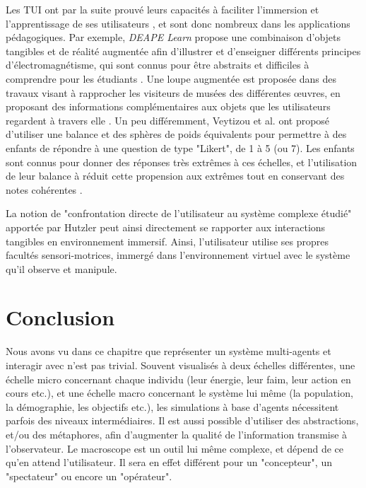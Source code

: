 			Les TUI ont par la suite prouvé leurs capacités à faciliter l'immersion et l'apprentissage de ses utilisateurs \cite{zuckerman_tui_2013, fleck_marker-based_2015, cheng_affordances_2013}, et sont donc nombreux dans les applications pédagogiques. Par exemple, \textit{DEAPE Learn} propose une combinaison d'objets tangibles et de réalité augmentée afin d'illustrer et d'enseigner différents principes d'électromagnétisme, qui sont connus pour être abstraits et difficiles à comprendre pour les étudiants \cite{da_costa_realite_2019}. Une loupe augmentée est proposée dans des travaux visant à rapprocher les visiteurs de musées des différentes œuvres, en proposant des informations complémentaires aux objets que les utilisateurs regardent à travers elle  \cite{damala_loupe_2016}. Un peu différemment, Veytizou et al. ont proposé d'utiliser une balance et des sphères de poids équivalents pour permettre à des enfants de répondre à une question de type "Likert", de 1 à 5 (ou 7). Les enfants sont connus pour donner des réponses très extrêmes à ces échelles, et l'utilisation de leur balance à réduit cette propension aux extrêmes tout en conservant des notes cohérentes \cite{veytizou_could_2018}.
	
	La notion de "confrontation directe de l'utilisateur au système complexe étudié" apportée par Hutzler \cite{hutzler_du_2000} peut ainsi directement se rapporter aux interactions tangibles en environnement immersif. Ainsi, l'utilisateur utilise ses propres facultés sensori-motrices, immergé dans l'environnement virtuel avec le système qu'il observe et manipule.
	
				
	\section*{Conclusion}
	
		Nous avons vu dans ce chapitre que représenter un système multi-agents et interagir avec n'est pas trivial. Souvent visualisés à deux échelles différentes, une échelle micro concernant chaque individu (leur énergie, leur faim, leur action en cours etc.), et une échelle macro concernant le système lui même (la population, la démographie, les objectifs etc.), les simulations à base d'agents nécessitent parfois des niveaux intermédiaires. Il est aussi possible d'utiliser des abstractions, et/ou des métaphores, afin d'augmenter la qualité de l'information transmise à l'observateur. Le macroscope est un outil lui même complexe, et dépend de ce qu'en attend l'utilisateur. Il sera en effet différent pour un "concepteur", un "spectateur" ou encore un "opérateur".
		
